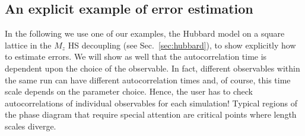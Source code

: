 %
\subsection{An explicit example of error estimation}\label{sec:autocorr}
%
In the following we use one of our examples, the Hubbard model on a square lattice in the $M_z$ HS decoupling (see Sec.~\ref{sec:hubbard}), to show explicitly how to estimate errors.  We will show as well that the  autocorrelation time is dependent upon the  choice of the observable.  In fact, different observables within the same run can have different autocorrelation times and, of course, this time scale depends on the  parameter choice.  Hence, the user has to check  autocorrelations of individual observables for each simulation!  Typical regions of the phase diagram that require special attention are critical points  where length scales diverge.  

